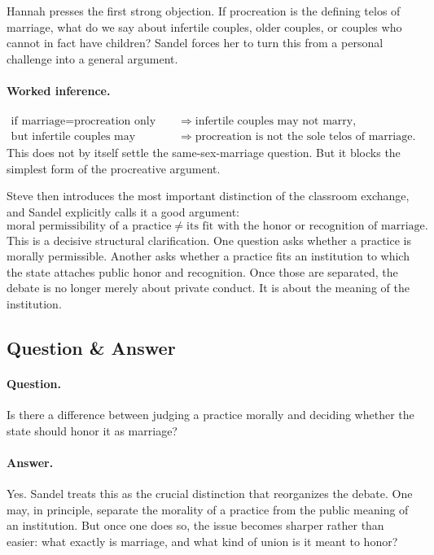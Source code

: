 Hannah presses the first strong objection. If procreation is the defining telos of marriage, what do we say about infertile couples, older couples, or couples who cannot in fact have children? Sandel forces her to turn this from a personal challenge into a general argument.

\paragraph{Worked inference.}
\begin{align}
\text{if } \text{marriage} = \text{procreation only}
&\Longrightarrow
\text{infertile couples may not marry},\\
\text{but infertile couples may marry}
&\Longrightarrow
\text{procreation is not the sole telos of marriage}.
\end{align}
This does not by itself settle the same-sex-marriage question. But it blocks the simplest form of the procreative argument.

Steve then introduces the most important distinction of the classroom exchange, and Sandel explicitly calls it a good argument:
\begin{equation}
\text{moral permissibility of a practice}
\neq
\text{its fit with the honor or recognition of marriage}.
\end{equation}
This is a decisive structural clarification. One question asks whether a practice is morally permissible. Another asks whether a practice fits an institution to which the state attaches public honor and recognition. Once those are separated, the debate is no longer merely about private conduct. It is about the meaning of the institution.

\subsection{Question \& Answer}

\paragraph{Question.} Is there a difference between judging a practice morally and deciding whether the state should honor it as marriage?

\paragraph{Answer.} Yes. Sandel treats this as the crucial distinction that reorganizes the debate. One may, in principle, separate the morality of a practice from the public meaning of an institution. But once one does so, the issue becomes sharper rather than easier: what exactly is marriage, and what kind of union is it meant to honor?


